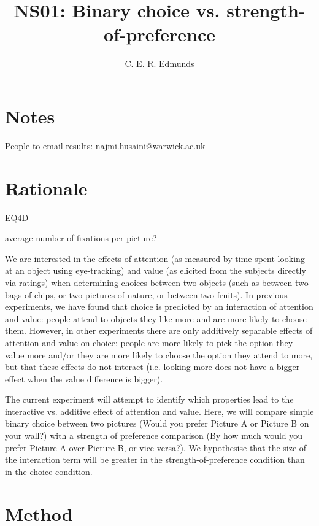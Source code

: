 \documentclass[12pt]{article}
\title{NS01: Binary choice vs. strength-of-preference}
\author{C. E. R. Edmunds}
\date{}
\begin{document}
\maketitle

\doublespacing

\section{Notes}
People to email results: najmi.husaini@warwick.ac.uk

\section{Rationale}

EQ4D

average number of fixations per picture?

We are interested in the effects of attention (as measured by time spent looking at an object using eye-tracking) and value (as elicited from the subjects directly via ratings) when determining choices between two objects (such as between two bags of chips, or two pictures of nature, or between two fruits). In previous experiments, we have found that choice is predicted by an interaction of attention and value: people attend to objects they like more and are more likely to choose them. However, in other experiments there are only additively separable effects of attention and value on choice: people are more likely to pick the option they value more and/or they are more likely to choose the option they attend to more, but that these effects do not interact (i.e. looking more does not have a bigger effect when the value difference is bigger). 
 
The current experiment will attempt to identify which properties lead to the interactive vs. additive effect of attention and value. Here, we will compare simple binary choice between two pictures (Would you prefer Picture A or Picture B on your wall?) with a strength of preference comparison (By how much would you prefer Picture A over Picture B, or vice versa?). We hypothesise that the size of the interaction term will be greater in the strength-of-preference condition than in the choice condition. 

\section{Method}
\end{document}
